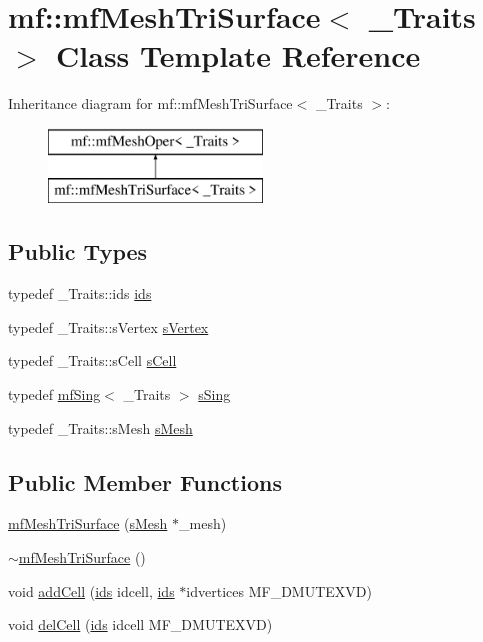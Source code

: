 \hypertarget{classmf_1_1mfMeshTriSurface}{
\section{mf::mfMeshTriSurface$<$ \_\-Traits $>$ Class Template Reference}
\label{classmf_1_1mfMeshTriSurface}
}
Inheritance diagram for mf::mfMeshTriSurface$<$ \_\-Traits $>$:\begin{figure}[H]
\begin{center}
\leavevmode
\includegraphics[height=2.000000cm]{classmf_1_1mfMeshTriSurface}
\end{center}
\end{figure}
\subsection*{Public Types}
\begin{DoxyCompactItemize}
\item 
typedef \_\-Traits::ids \hyperlink{classmf_1_1mfMeshTriSurface_a2432b4eb1b385605e96d17e2774519f5}{ids}
\item 
typedef \_\-Traits::sVertex \hyperlink{classmf_1_1mfMeshTriSurface_a2408391103a6d2805d76654edd468059}{sVertex}
\item 
typedef \_\-Traits::sCell \hyperlink{classmf_1_1mfMeshTriSurface_a75283f44a5903a67f6bbb7094b8a900f}{sCell}
\item 
typedef \hyperlink{classmf_1_1mfSing}{mfSing}$<$ \_\-Traits $>$ \hyperlink{classmf_1_1mfMeshTriSurface_ae3b4bcef281c3802394aa264db8bcfa8}{sSing}
\item 
typedef \_\-Traits::sMesh \hyperlink{classmf_1_1mfMeshTriSurface_aa25d8c016f15b0073c5ba5aa0a64be86}{sMesh}
\end{DoxyCompactItemize}
\subsection*{Public Member Functions}
\begin{DoxyCompactItemize}
\item 
\hyperlink{classmf_1_1mfMeshTriSurface_a65c2be08d78df0b8730f242c3ab1c30c}{mfMeshTriSurface} (\hyperlink{classmf_1_1mfMeshOper_a96c05da9a054cf9ac58d15211922f936}{sMesh} $\ast$\_\-mesh)
\item 
\hyperlink{classmf_1_1mfMeshTriSurface_ab9d17a264650f0cd52308e7b07580b5a}{$\sim$mfMeshTriSurface} ()
\item 
void \hyperlink{classmf_1_1mfMeshTriSurface_afde5244f145f55c02da44551007a4714}{addCell} (\hyperlink{classmf_1_1mfMeshOper_a526d1466339244781fbdc0dbfe5ad210}{ids} idcell, \hyperlink{classmf_1_1mfMeshOper_a526d1466339244781fbdc0dbfe5ad210}{ids} $\ast$idvertices MF\_\-DMUTEXVD)
\item 
void \hyperlink{classmf_1_1mfMeshTriSurface_a355433359c4c4137b1f1a271278a7cbe}{delCell} (\hyperlink{classmf_1_1mfMeshOper_a526d1466339244781fbdc0dbfe5ad210}{ids} idcell MF\_\-DMUTEXVD)
\end{DoxyCompactItemize}
